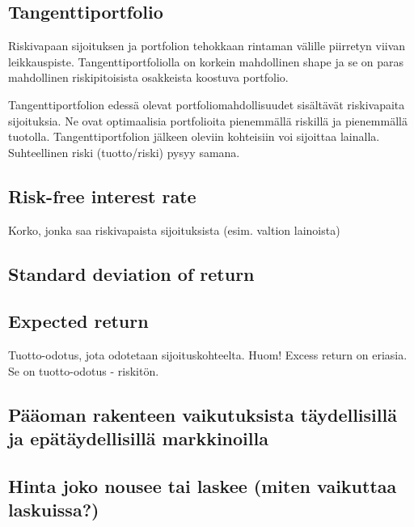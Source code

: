 \documentclass[a4paper]{article}
\begin{document}
\subsection{Tangenttiportfolio}

Riskivapaan sijoituksen ja portfolion tehokkaan rintaman välille piirretyn viivan leikkauspiste. Tangenttiportfoliolla on korkein mahdollinen shape ja se on paras mahdollinen riskipitoisista osakkeista koostuva portfolio.

Tangenttiportfolion edessä olevat portfoliomahdollisuudet sisältävät riskivapaita sijoituksia. Ne ovat optimaalisia portfolioita pienemmällä riskillä ja pienemmällä tuotolla. Tangenttiportfolion jälkeen oleviin kohteisiin voi sijoittaa lainalla. Suhteellinen riski (tuotto/riski) pysyy samana.

\subsection{Risk-free interest rate}

Korko, jonka saa riskivapaista sijoituksista (esim. valtion lainoista)

\subsection{Standard deviation of return}

\subsection{Expected return}

Tuotto-odotus, jota odotetaan sijoituskohteelta. Huom! Excess return on eriasia. Se on tuotto-odotus - riskitön.

\subsection{Pääoman rakenteen vaikutuksista täydellisillä ja epätäydellisillä markkinoilla}

\subsection{Hinta joko nousee tai laskee (miten vaikuttaa laskuissa?)}

\end{document}
